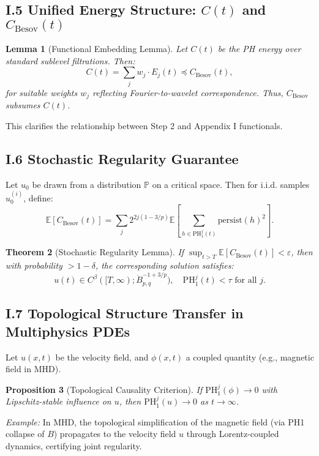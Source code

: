 \documentclass[11pt]{article}
\newtheorem{theorem}{Theorem}[section]
\newtheorem{lemma}[theorem]{Lemma}
\newtheorem{proposition}[theorem]{Proposition}
\theoremstyle{definition}
\begin{document}
\subsection*{I.5 Unified Energy Structure: $C(t)$ and $C_{\mathrm{Besov}}(t)$}
\begin{lemma}[Functional Embedding Lemma]
Let $C(t)$ be the PH energy over standard sublevel filtrations. Then:
\[
C(t) = \sum_j w_j \cdot E_j(t) \preceq C_{\mathrm{Besov}}(t),
\]
for suitable weights $w_j$ reflecting Fourier-to-wavelet correspondence. Thus, $C_{\mathrm{Besov}}$ subsumes $C(t)$.
\end{lemma}
This clarifies the relationship between Step 2 and Appendix I functionals.

\subsection*{I.6 Stochastic Regularity Guarantee}
Let $u_0$ be drawn from a distribution $\mathbb{P}$ on a critical space. Then for i.i.d. samples $u_0^{(i)}$, define:
\[
\mathbb{E}[C_{\mathrm{Besov}}(t)] = \sum_j 2^{2j(1-3/p)} \mathbb{E}\left[ \sum_{h \in \mathrm{PH}^j_1(t)} \mathrm{persist}(h)^2 \right].
\]
\begin{theorem}[Stochastic Regularity Lemma]
If $\sup_{t > T} \mathbb{E}[C_{\mathrm{Besov}}(t)] < \varepsilon$, then with probability $> 1 - \delta$, the corresponding solution satisfies:
\[
u(t) \in C^\beta([T,\infty); \dot{B}^{-1+3/p}_{p,q}), \quad \mathrm{PH}^j_1(t) < \tau \text{ for all } j.\]
\end{theorem}

\subsection*{I.7 Topological Structure Transfer in Multiphysics PDEs}
Let $u(x,t)$ be the velocity field, and $\phi(x,t)$ a coupled quantity (e.g., magnetic field in MHD).
\begin{proposition}[Topological Causality Criterion]
If $\mathrm{PH}_1^j(\phi) \to 0$ with Lipschitz-stable influence on $u$, then $\mathrm{PH}_1^j(u) \to 0$ as $t \to \infty$.
\end{proposition}
\textit{Example:} In MHD, the topological simplification of the magnetic field (via PH1 collapse of $B$) propagates to the velocity field $u$ through Lorentz-coupled dynamics, certifying joint regularity.
\end{document}

